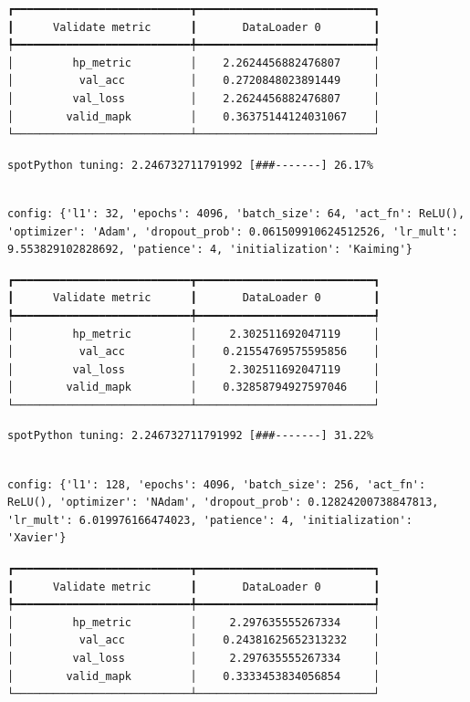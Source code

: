 \documentclass[
  letterpaper,
  DIV=11,
  numbers=noendperiod]{scrreprt}
\begin{document}
\begin{verbatim}
┏━━━━━━━━━━━━━━━━━━━━━━━━━━━┳━━━━━━━━━━━━━━━━━━━━━━━━━━━┓
┃      Validate metric      ┃       DataLoader 0        ┃
┡━━━━━━━━━━━━━━━━━━━━━━━━━━━╇━━━━━━━━━━━━━━━━━━━━━━━━━━━┩
│         hp_metric         │    2.2624456882476807     │
│          val_acc          │    0.2720848023891449     │
│         val_loss          │    2.2624456882476807     │
│        valid_mapk         │    0.36375144124031067    │
└───────────────────────────┴───────────────────────────┘
\end{verbatim}

\begin{verbatim}
spotPython tuning: 2.246732711791992 [###-------] 26.17% 
\end{verbatim}

\begin{verbatim}

config: {'l1': 32, 'epochs': 4096, 'batch_size': 64, 'act_fn': ReLU(), 'optimizer': 'Adam', 'dropout_prob': 0.061509910624512526, 'lr_mult': 9.553829102828692, 'patience': 4, 'initialization': 'Kaiming'}
\end{verbatim}

\begin{verbatim}
┏━━━━━━━━━━━━━━━━━━━━━━━━━━━┳━━━━━━━━━━━━━━━━━━━━━━━━━━━┓
┃      Validate metric      ┃       DataLoader 0        ┃
┡━━━━━━━━━━━━━━━━━━━━━━━━━━━╇━━━━━━━━━━━━━━━━━━━━━━━━━━━┩
│         hp_metric         │     2.302511692047119     │
│          val_acc          │    0.21554769575595856    │
│         val_loss          │     2.302511692047119     │
│        valid_mapk         │    0.32858794927597046    │
└───────────────────────────┴───────────────────────────┘
\end{verbatim}

\begin{verbatim}
spotPython tuning: 2.246732711791992 [###-------] 31.22% 
\end{verbatim}

\begin{verbatim}

config: {'l1': 128, 'epochs': 4096, 'batch_size': 256, 'act_fn': ReLU(), 'optimizer': 'NAdam', 'dropout_prob': 0.12824200738847813, 'lr_mult': 6.019976166474023, 'patience': 4, 'initialization': 'Xavier'}
\end{verbatim}

\begin{verbatim}
┏━━━━━━━━━━━━━━━━━━━━━━━━━━━┳━━━━━━━━━━━━━━━━━━━━━━━━━━━┓
┃      Validate metric      ┃       DataLoader 0        ┃
┡━━━━━━━━━━━━━━━━━━━━━━━━━━━╇━━━━━━━━━━━━━━━━━━━━━━━━━━━┩
│         hp_metric         │     2.297635555267334     │
│          val_acc          │    0.24381625652313232    │
│         val_loss          │     2.297635555267334     │
│        valid_mapk         │    0.3333453834056854     │
└───────────────────────────┴───────────────────────────┘
\end{verbatim}
\end{document}
